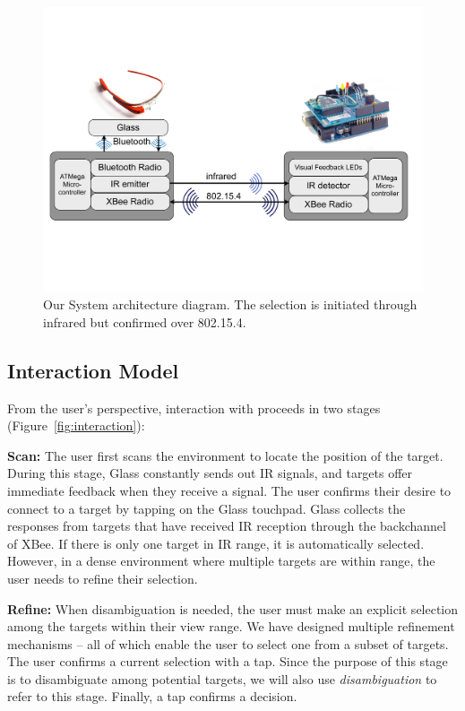 \begin{figure}[t]
\centering
\includegraphics[width=1\columnwidth]{figures/architecture_new}
\caption{Our System architecture diagram. The selection is initiated through infrared but confirmed over 802.15.4.}
\label{fig:architecture}
\end{figure}



\subsection{Interaction Model}
From the user's perspective, interaction with \systemname proceeds in two stages (Figure~\ref{fig:interaction}): 

{\bf Scan:} The user first scans the environment to locate the position of the target. During this stage, Glass constantly sends out IR signals, and  targets offer immediate feedback when they receive a signal. The user confirms their desire to connect to a target by tapping on the Glass touchpad. Glass collects the responses from targets that have received IR reception through the backchannel of XBee. If there is only one target in IR range, it is automatically selected. However, in a dense environment where multiple targets are within range, the user needs to refine their selection.

{\bf Refine:} When disambiguation is needed, the user must make an explicit selection among the targets within their view range. We have designed multiple refinement mechanisms -- all of which enable the user to select one from a subset of targets. The user confirms a current selection with a tap. Since the purpose of this stage is to disambiguate among potential targets, we will also use {\em disambiguation} to refer to this stage. Finally, a tap confirms a decision.


